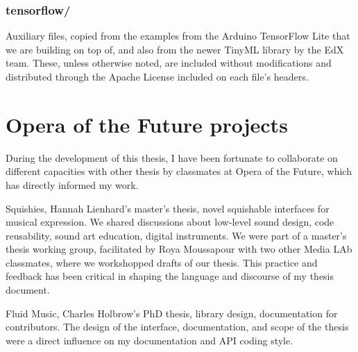 \subsubsection{tensorflow/}

Auxiliary files, copied from the examples from the Arduino TensorFlow Lite that we are building on top of, and also from the newer TinyML library by the EdX team. These, unless otherwise noted, are included without modifications and distributed through the Apache License included on each file's headers.

\section{Opera of the Future projects}

During the development of this thesis, I have been fortunate to collaborate on different capacities with other thesis by classmates at Opera of the Future, which has directly informed my work.

Squishies, Hannah Lienhard's master's thesis, novel squishable interfaces for musical expression. We shared discussions about low-level sound design, code reusability, sound art education, digital instruments. We were part of a master's thesis working group, facilitated by Roya Moussapour with two other Media LAb classmates, where we workshopped drafts of our thesis. This practice and feedback has been critical in shaping the language and discourse of my thesis document.

Fluid Music, Charles Holbrow's PhD thesis, library design, documentation for contributors. The design of the interface, documentation, and scope of the thesis were a direct influence on my documentation and API coding style.
